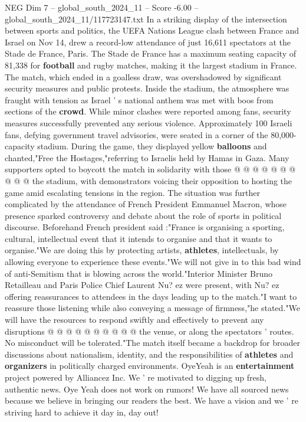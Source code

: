 \begin{textsample}{NEG Dim 7 – global\_south\_2024\_11 – Score -6.00 – global\_south\_2024\_11/117723147.txt}  \label{ex:f7_neg_431}
In a striking display of the intersection between sports and politics, the UEFA Nations League clash between France and Israel on Nov 14, drew a record-low attendance of just 16,611 spectators at the Stade de France, Paris.
The Stade de France has a maximum seating capacity of 81,338 for \textbf{football} and rugby matches, making it the largest stadium in France.
The match, which ended in a goalless draw, was overshadowed by significant security measures and public protests.
Inside the stadium, the atmosphere was fraught with tension as Israel ' s national anthem was met with boos from sections of the \textbf{crowd}.
While minor clashes were reported among fans, security measures successfully prevented any serious violence.
Approximately 100 Israeli fans, defying government travel advisories, were seated in a corner of the 80,000-capacity stadium.
During the game, they displayed yellow \textbf{balloons} and chanted,"Free the Hostages,"referring to Israelis held by Hamas in Gaza.
Many supporters opted to boycott the match in solidarity with those @ @ @ @ @ @ @ @ @ @ the stadium, with demonstrators voicing their opposition to hosting the game amid escalating tensions in the region.
The situation was further complicated by the attendance of French President Emmanuel Macron, whose presence sparked controversy and debate about the role of sports in political discourse.
Beforehand French president said :"France is organising a sporting, cultural, intellectual event that it intends to organise and that it wants to organise."We are doing this by protecting artists, \textbf{athletes}, intellectuals, by allowing everyone to experience these events."We will not give in to this bad wind of anti-Semitism that is blowing across the world."Interior Minister Bruno Retailleau and Paris Police Chief Laurent Nu? ez were present, with Nu? ez offering reassurances to attendees in the days leading up to the match."I want to reassure those listening while also conveying a message of firmness,"he stated."We will have the resources to respond swiftly and effectively to prevent any disruptions @ @ @ @ @ @ @ @ @ @ the venue, or along the spectators ' routes.
No misconduct will be tolerated."The match itself became a backdrop for broader discussions about nationalism, identity, and the responsibilities of \textbf{athletes} and \textbf{organizers} in politically charged environments.
OyeYeah is an \textbf{entertainment} project powered by Alliancez Inc.
We ' re motivated to digging up fresh, authentic news.
Oye Yeah does not work on rumors!
We have all sourced news because we believe in bringing our readers the best.
We have a vision and we ' re striving hard to achieve it day in, day out!

\end{textsample}
